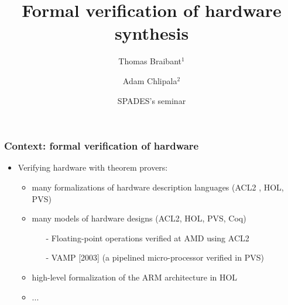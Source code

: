 \documentclass[9pt]{beamer}
\title{Formal verification of hardware synthesis}%
\author[T. Braibant]{Thomas Braibant$^1$ \and Adam Chlipala$^2$}
\institute[Inria]{Inria$^1$ (Gallium) \qquad MIT CSAIL$^2$}
\date[05/2013]{SPADES's seminar}
\newcommand{\redemph}[1]{\alert{\emph{#1}}}
\begin{document}
\newcommand \orange[1]{{\color{orange}{#1}}}

\newcommand\parenthesis[1] {
  \begin{flushright}
    {\scriptsize \redemph{{{{ #1}}}}}
  \end{flushright}

}

\begin{frame}
  \center 
  \titlepage
\end{frame} 

\begin{frame}
  \frametitle{Context: formal verification of hardware}
  
  \begin{itemize}
    
    
  \item Verifying hardware with theorem provers:
    \begin{itemize}
    \item many formalizations of hardware description languages (ACL2 , HOL, PVS)
    \item many models of hardware designs (ACL2, HOL, PVS, Coq) 
      \begin{itemize}
      \item[-] Floating-point operations verified at AMD using ACL2 
      \item[-] VAMP [2003]  (a pipelined micro-processor verified in PVS)
      \end{itemize}
    \item high-level formalization of the ARM architecture in HOL
    \item ...
    \end{itemize}


\end{itemize}
\end{frame}
\end{document}
